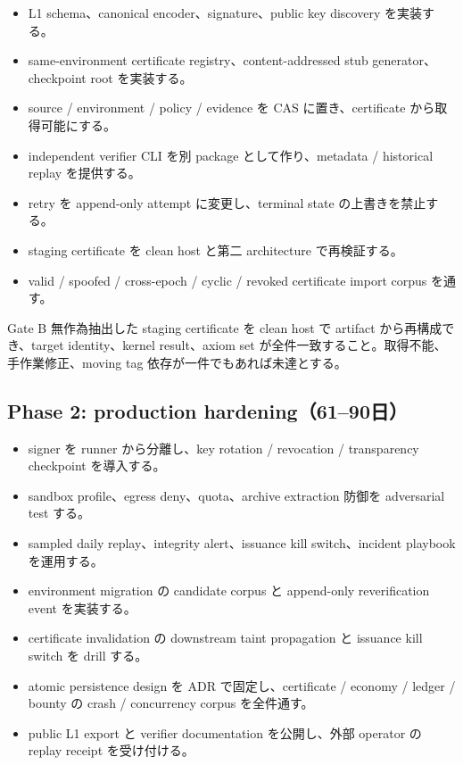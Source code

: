 \documentclass[a4paper,11pt]{ltjsarticle}
\begin{document}
\begin{itemize}
  \item L1 schema、canonical encoder、signature、public key discovery を実装する。
  \item same-environment certificate registry、content-addressed stub generator、checkpoint root を実装する。
  \item source / environment / policy / evidence を CAS に置き、certificate から取得可能にする。
  \item independent verifier CLI を別 package として作り、metadata / historical replay を提供する。
  \item retry を append-only attempt に変更し、terminal state の上書きを禁止する。
  \item staging certificate を clean host と第二 architecture で再検証する。
  \item valid / spoofed / cross-epoch / cyclic / revoked certificate import corpus を通す。
\end{itemize}

\begin{decisionbox}{Gate B}
無作為抽出した staging certificate を clean host で artifact から再構成でき、target identity、kernel result、axiom
set が全件一致すること。取得不能、手作業修正、moving tag 依存が一件でもあれば未達とする。
\end{decisionbox}

\subsection{Phase 2: production hardening（61--90日）}

\begin{itemize}
  \item signer を runner から分離し、key rotation / revocation / transparency checkpoint を導入する。
  \item sandbox profile、egress deny、quota、archive extraction 防御を adversarial test する。
  \item sampled daily replay、integrity alert、issuance kill switch、incident playbook を運用する。
  \item environment migration の candidate corpus と append-only reverification event を実装する。
  \item certificate invalidation の downstream taint propagation と issuance kill switch を drill する。
  \item atomic persistence design を ADR で固定し、certificate / economy / ledger / bounty の crash / concurrency corpus を全件通す。
  \item public L1 export と verifier documentation を公開し、外部 operator の replay receipt を受け付ける。
\end{itemize}
\end{document}
